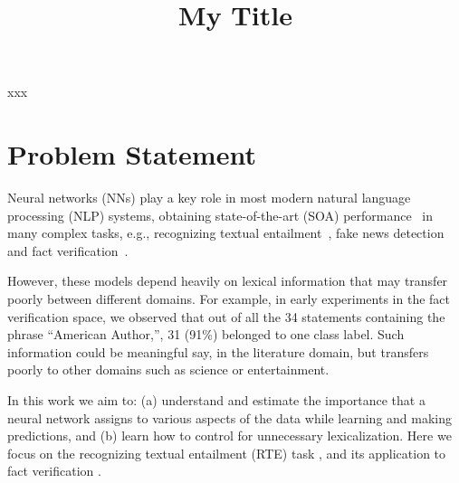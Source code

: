 \documentclass[conference,onecolumn]{IEEEtran}
\begin{document}
\title{My Title}  


\author{\IEEEauthorblockN{}
}



\maketitle


\begin{IEEEkeywords}
xxx
\end{IEEEkeywords}


%



\section*{Problem Statement}
Neural networks (NNs)  play a key role in most modern natural language processing (NLP) systems, obtaining state-of-the-art (SOA) performance~\cite{devlin2018bert, sun2018improving,bohnet2018morphosyntactic} in many complex tasks, e.g., recognizing textual entailment~\cite{kim2018semantic}, fake news detection~\cite{baird2017talos} and fact verification~\cite{nie2018combining}.

However, these models depend heavily on lexical information that may transfer poorly between different domains. For example, in early experiments in the fact verification space, we observed that out of all the 34 statements containing the phrase ``American Author,'', 31 (91\%) belonged to one class label. Such information could be meaningful say, in the literature domain, but transfers poorly to other domains such as science or entertainment. 

In this work we aim to: (a) understand and estimate the importance that a neural network assigns to various aspects of the data while learning and making predictions, and (b) learn how to control for unnecessary lexicalization. Here we focus on the recognizing textual entailment (RTE) task \cite{dagan2013recognizing}, and its application to fact verification \cite{thorne2018fever, pomerleau2017fake}.
\end{document}
